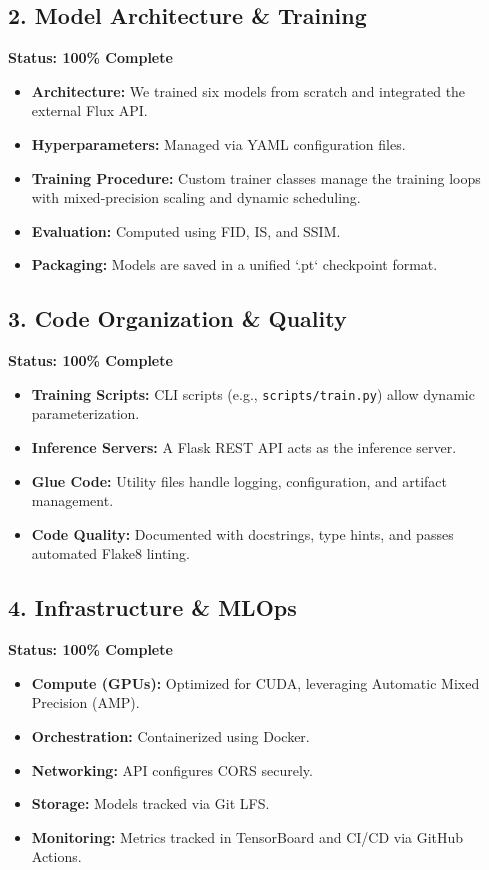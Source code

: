 \documentclass[12pt,a4paper]{article}
\begin{document}
\subsection{2. Model Architecture \& Training}
\textbf{Status: 100\% Complete} \\
\begin{itemize}
    \item \textbf{Architecture:} We trained six models from scratch and integrated the external Flux API.
    \item \textbf{Hyperparameters:} Managed via YAML configuration files.
    \item \textbf{Training Procedure:} Custom trainer classes manage the training loops with mixed-precision scaling and dynamic scheduling.
    \item \textbf{Evaluation:} Computed using FID, IS, and SSIM.
    \item \textbf{Packaging:} Models are saved in a unified `.pt` checkpoint format.
\end{itemize}

\subsection{3. Code Organization \& Quality}
\textbf{Status: 100\% Complete} \\
\begin{itemize}
    \item \textbf{Training Scripts:} CLI scripts (e.g., \texttt{scripts/train.py}) allow dynamic parameterization.
    \item \textbf{Inference Servers:} A Flask REST API acts as the inference server.
    \item \textbf{Glue Code:} Utility files handle logging, configuration, and artifact management.
    \item \textbf{Code Quality:} Documented with docstrings, type hints, and passes automated Flake8 linting.
\end{itemize}

\subsection{4. Infrastructure \& MLOps}
\textbf{Status: 100\% Complete} \\
\begin{itemize}
    \item \textbf{Compute (GPUs):} Optimized for CUDA, leveraging Automatic Mixed Precision (AMP).
    \item \textbf{Orchestration:} Containerized using Docker.
    \item \textbf{Networking:} API configures CORS securely.
    \item \textbf{Storage:} Models tracked via Git LFS.
    \item \textbf{Monitoring:} Metrics tracked in TensorBoard and CI/CD via GitHub Actions.
\end{itemize}
\end{document}
